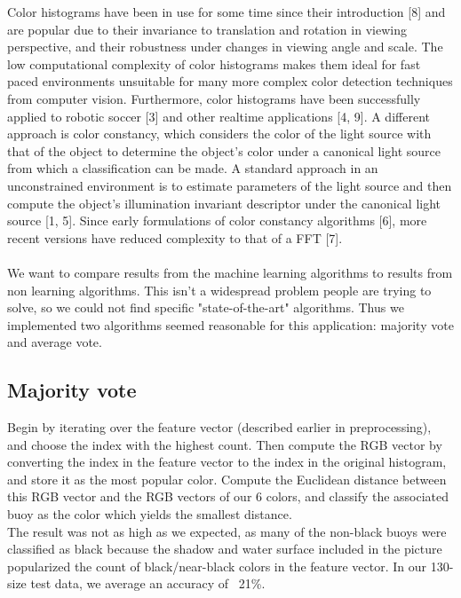 \documentclass{article} %
\begin{document}
Color histograms have been in use for some time since their introduction [8] and are popular due to their invariance to translation and rotation in viewing perspective, and their robustness under changes in viewing angle and scale. The low computational complexity of color histograms makes them ideal for fast paced environments unsuitable for many more complex color detection techniques from computer vision. Furthermore, color histograms have been successfully applied to robotic soccer [3] and other realtime applications [4, 9]. A different approach is color constancy, which considers the color of the light source with that of the object to determine the object's color under a canonical light source from which a classification can be made. A standard approach in an unconstrained environment is to estimate parameters of the light source and then compute the object's illumination invariant descriptor under the canonical light source [1, 5]. Since early formulations of color constancy algorithms [6], more recent versions have reduced complexity to that of a FFT [7]. \\\\

We want to compare results from the machine learning algorithms to results from non learning algorithms. This isn't a widespread problem people are trying to solve, so we could not find specific "state-of-the-art" algorithms. Thus we implemented two algorithms seemed reasonable for this application: majority vote and average vote.

\subsection{Majority vote}
Begin by iterating over the feature vector (described earlier in preprocessing), and choose the index with the highest count. Then compute the RGB vector by converting the index in the feature vector to the index in the original histogram, and store it as the most popular color. Compute the Euclidean distance between this RGB vector and the RGB vectors of our 6 colors, and classify the associated buoy as the color which yields the smallest distance.\\
The result was not as high as we expected, as many of the non-black buoys were classified as black because the shadow and water surface included in the picture popularized the count of black/near-black colors in the feature vector. In our 130-size test data, we average an accuracy of ~21\%.
\end{document}
